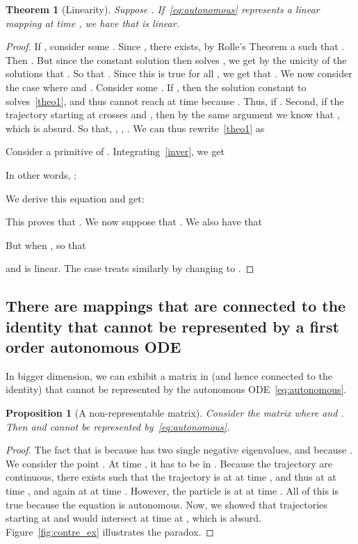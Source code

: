 \documentclass{article}
\newtheorem{theorem}{Theorem}
\newtheorem{proposition}{Proposition}
\begin{document}
\begin{theorem}[Linearity]\label{theo1}
Suppose . If~\eqref{eq:autonomous} represents a linear mapping  at time , we have that  is linear.
\end{theorem}
\begin{proof}
If , consider some . Since , there exists, by Rolle's Theorem a  such that . Then . But since the constant solution  then solves , we get by the unicity of the solutions that . So that . Since this is true for all , we get that . We now consider the case where  and .
Consider some . If , then the solution constant to  solves~\eqref{theo1}, and thus cannot reach  at time  because . Thus,  if . Second, if the trajectory starting at  crosses  and , then by the same argument we know that , which is absurd. So that, , ,  .
We can thus rewrite~\eqref{theo1} as 

Consider  a primitive of .
Integrating~\eqref{inver}, we get

In other words, :

We derive this equation and get:

This proves that .
We now suppose that .
We also have that 

But when ,  so that 

and  is linear.
The case  treats similarly by changing  to .
\end{proof}




\subsection{There are mappings that are connected to the identity that cannot be represented by a first order autonomous ODE}

In bigger dimension, we can exhibit a matrix in  (and hence connected to the identity) that cannot be represented by the autonomous ODE~\eqref{eq:autonomous}.
\begin{proposition}[A non-representable matrix]\label{prop:contre_ex}
Consider the matrix 
 where  and .
Then  and  cannot be represented by~\eqref{eq:autonomous}.
\end{proposition}
\begin{proof}
The fact that  is because  has two single negative eigenvalues, and because .
We consider the point . At time , it has to be in . Because the trajectory are continuous, there exists  such that the trajectory is at  at time , and thus at  at time , and again at  at time . However, the particle is at  at time . All of this is true because the equation is autonomous. Now, we showed that trajectories starting at  and  would intersect at time  at , which is absurd. Figure~\ref{fig:contre_ex} illustrates the paradox.
\end{proof}
\end{document}
